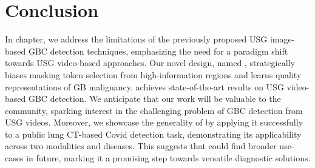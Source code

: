 \section{Conclusion}
In chapter, we address the limitations of the previously proposed USG image-based GBC detection techniques, emphasizing the need for a paradigm shift towards USG video-based approaches. Our novel design, named \focusmae, strategically biases masking token selection from high-information regions and learns quality representations of GB malignancy. \focusmae achieves state-of-the-art results on USG video-based GBC detection.  
We anticipate that our work will be valuable to the community, sparking interest in the challenging problem of GBC detection from USG videos. Moreover, we showcase the generality of \focusmae by applying it successfully to a public lung CT-based Covid detection task, demonstrating its applicability across two modalities and diseases. This suggests that \focusmae could find broader use-cases in future, marking it a promising step towards versatile diagnostic solutions.